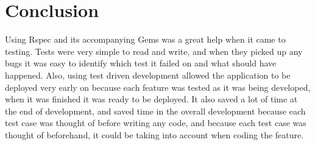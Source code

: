 \section{Conclusion}
Using Rspec and its accompanying Gems was a great help when it came to testing. Tests were very simple to read and write, and when they picked up any bugs it was easy to identify which test it failed on and what should have happened. Also, using test driven development allowed the application to be deployed very early on because each feature was tested as it was being developed, when it was finished it was ready to be deployed. It also saved a lot of time at the end of development, and saved time in the overall development because each test case was thought of before writing any code, and because each test case was thought of beforehand, it could be taking into account when coding the feature. 